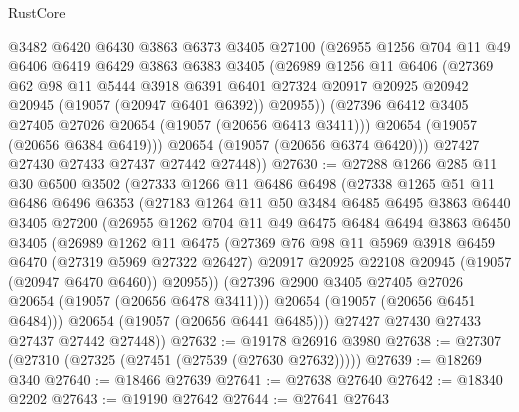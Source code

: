 \begin{lexlean}{RustCore}
\begin{coremodule}
          @3482
          @6420
          @6430
          @3863
          @6373
          @3405
          @27100
          (@26955
            @1256
            @704
            @11
            @49
            @6406
            @6419
            @6429
            @3863
            @6383
            @3405
            (@26989
              @1256
              @11
              @6406
              (@27369
                @62
                @98
                @11
                @5444
                @3918
                @6391
                @6401
                @27324
                @20917
                @20925
                @20942
                @20945
                (@19057 (@20947 @6401 @6392))
                @20955))
            (@27396 @6412 @3405 @27405 @27026 @20654 (@19057 (@20656 @6413 @3411)))
            @20654
            (@19057 (@20656 @6384 @6419)))
          @20654
          (@19057 (@20656 @6374 @6420)))
        @27427
        @27430
        @27433
        @27437
        @27442
        @27448))
@27630 := @27288
    @1266
    @285
    @11
    @30
    @6500
    @3502
    (@27333
      @1266
      @11
      @6486
      @6498
      (@27338
        @1265
        @51
        @11
        @6486
        @6496
        @6353
        (@27183
          @1264
          @11
          @50
          @3484
          @6485
          @6495
          @3863
          @6440
          @3405
          @27200
          (@26955
            @1262
            @704
            @11
            @49
            @6475
            @6484
            @6494
            @3863
            @6450
            @3405
            (@26989
              @1262
              @11
              @6475
              (@27369
                @76
                @98
                @11
                @5969
                @3918
                @6459
                @6470
                (@27319 @5969 @27322 @26427)
                @20917
                @20925
                @22108
                @20945
                (@19057 (@20947 @6470 @6460))
                @20955))
            (@27396 @2900 @3405 @27405 @27026 @20654 (@19057 (@20656 @6478 @3411)))
            @20654
            (@19057 (@20656 @6451 @6484)))
          @20654
          (@19057 (@20656 @6441 @6485)))
        @27427
        @27430
        @27433
        @27437
        @27442
        @27448))
@27632 := @19178 @26916 @3980
@27638 := @27307 (@27310 (@27325 (@27451 (@27539 (@27630 @27632)))))
@27639 := @18269 @340
@27640 := @18466 @27639
@27641 := @27638 @27640
@27642 := @18340 @2202
@27643 := @19190 @27642
@27644 := @27641 @27643

\end{coremodule}
\end{lexlean}
